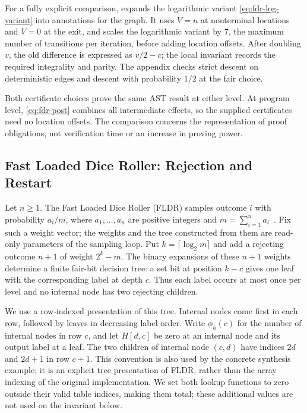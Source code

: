 For a fully explicit comparison,  expands
the logarithmic variant \eqref{eq:fdr-log-variant} into annotations
for the graph. It uses $V=n$ at nonterminal locations and $V=0$ at
the exit, and scales the logarithmic variant by $7$, the maximum
number of transitions per iteration, before adding location offsets.
After doubling $v$, the old difference is expressed as $v/2-c$;
the local invariant records the required integrality and parity.
The appendix checks strict descent on deterministic edges and descent
with probability $1/2$ at the fair choice.

Both certificate choices prove the same AST result at either level.
At program level, \eqref{eq:fdr-post} combines all intermediate effects,
so the supplied certificates need no location offsets. The comparison
concerns the representation of proof obligations, not verification
time or an increase in proving power.

\subsection{Fast Loaded Dice Roller: Rejection and Restart}
\label{sec:fldr}

Let $n\geq1$. The Fast Loaded Dice Roller (FLDR) samples outcome $i$
with probability $a_i/m$, where $a_1,\ldots,a_n$ are positive integers
and $m=\sum_{i=1}^n a_i$~\cite{DBLP:conf/aistats/SaadFRM20}.
Fix such a weight vector; the weights and the tree constructed from them
are read-only parameters of the sampling loop. Put
$k=\lceil\log_2m\rceil$ and add a rejecting outcome $n+1$ of weight
$2^k-m$. The binary expansions of these $n+1$ weights determine a finite
fair-bit decision tree: a set bit at position $k-c$ gives one leaf with
the corresponding label at depth $c$. Thus each label occurs at most
once per level and no internal node has two rejecting children.

We use a row-indexed presentation of this tree. Internal nodes come first
in each row, followed by leaves in decreasing label order. Write
$\phi_h(c)$ for the number of internal nodes in row $c$, and let
$H[d,c]$ be zero at an internal node and its output label at a leaf.
The two children of internal node $(c,d)$ have indices $2d$ and $2d+1$
in row $c+1$. This convention is also used by the concrete synthesis
example; it is an explicit tree presentation of FLDR, rather than the
array indexing of the original implementation. We set both lookup
functions to zero outside their valid table indices, making them total;
these additional values are not used on the invariant below.

